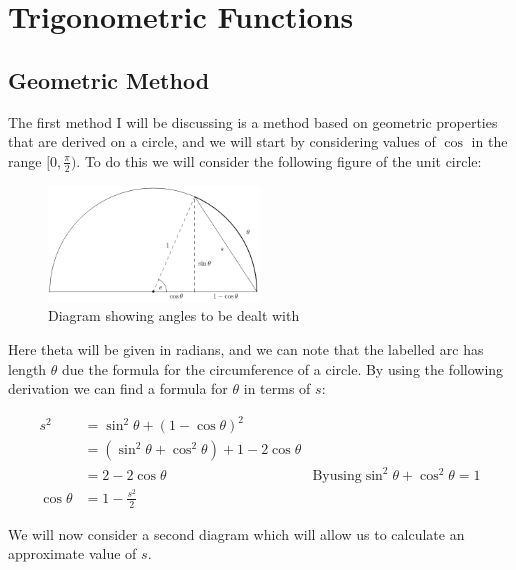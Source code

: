 \section{Trigonometric Functions}

\subsection{Geometric Method}
\label{SUB_"Trig Geometric Method"}

The first method I will be discussing is a method based on geometric properties that are derived on a circle, and we will start by considering values of \(\cos\) in the range \([0, \frac{\pi}{2})\). To do this we will consider the following figure of the unit circle:

\begin{figure}[!ht]
	\label{FIG_"Geometric Trig 1"}
	\caption{Diagram showing angles to be dealt with}
	\centering
	\includegraphics[width=0.5\textwidth]{"./Diagrams/Geometric Trig Diagram 1"}
\end{figure}

Here theta will be given in radians, and we can note that the labelled arc has length \(\theta\) due the formula for the circumference of a circle. By using the following derivation we can find a formula for \(\theta\) in terms of \(s\):

\begin{displaymath}
\begin{align*}
	s^2 &= \sin^2\theta + (1 - \cos\theta)^2\\
	    &= (\sin^2\theta + \cos^2\theta) + 1 - 2\cos\theta\\
		&= 2 - 2 \cos\theta 
			&\mathrm{By using } \sin^2\theta + \cos^2\theta = 1\\
	\cos\theta &= 1 - \frac{s^2}{2}
\end{align*}
\end{displaymath}

We will now consider a second diagram which will allow us to calculate an approximate value of \(s\).


